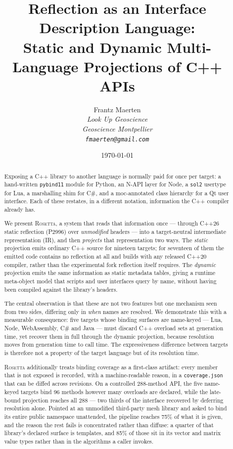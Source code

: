 \documentclass[11pt,a4paper]{article}
\title{\textbf{Reflection as an Interface Description Language:\\
Static and Dynamic Multi-Language Projections of C++ APIs}}
\author{
  Frantz Maerten\\
  \small\itshape{Look Up Geoscience}\\
  \small\itshape{Geoscience Montpellier}\\
  \small\texttt{fmaerten@gmail.com}
}
\date{\today}
\newcommand{\rosetta}{\textsc{Rosetta}}
\newcommand{\code}[1]{\texttt{\small #1}}
\begin{document}
\maketitle

\begin{abstract}
Exposing a C++ library to another language is normally paid for once per target:
a hand-written \code{pybind11} module for Python, an N-API layer for Node, a
\code{sol2} usertype for Lua, a marshalling shim for C\#, and a moc-annotated
class hierarchy for a Qt user interface. Each of these restates, in a different
notation, information the C++ compiler already has.

We present \rosetta, a system that reads that information once --- through
C++26 static reflection (P2996) over \emph{unmodified} headers --- into a
target-neutral intermediate representation (IR), and then \emph{projects} that
representation two ways. The \emph{static} projection emits ordinary C++ source
for nineteen targets; for seventeen of them the emitted code contains no
reflection at all and builds with any released C++20 compiler, rather than the
experimental fork reflection itself requires. The \emph{dynamic} projection emits the same information as
static metadata tables, giving a runtime meta-object model that scripts and user
interfaces query by name, without having been compiled against the library's
headers.

The central observation is that these are not two features but one mechanism
seen from two sides, differing only in \emph{when} names are resolved. We
demonstrate this with a measurable consequence: five targets whose binding
surfaces are name-keyed --- Lua, Node, WebAssembly, C\# and Java --- must discard
C++ overload sets at generation time, yet recover them in full through the
dynamic projection, because resolution moves from generation time to call time.
The expressiveness difference between targets is therefore not a property of the
target language but of its resolution time.

\rosetta{} additionally treats binding coverage as a first-class artifact: every
member that is not exposed is recorded, with a machine-readable reason, in a
\code{coverage.json} that can be diffed across revisions. On a controlled
288-method API, the five name-keyed targets bind 96 methods however many
overloads are declared, while the late-bound projection reaches all 288 ---
two thirds of the interface recovered by deferring resolution alone. Pointed at
an unmodified third-party mesh library and asked to bind its entire public
namespace unattended, the pipeline reaches 75\% of what it is given, and the
reason the rest fails is concentrated rather than diffuse: a quarter of that
library's declared surface is templates, and 85\% of those sit in its vector and
matrix value types rather than in the algorithms a caller invokes.
\end{abstract}
\end{document}
